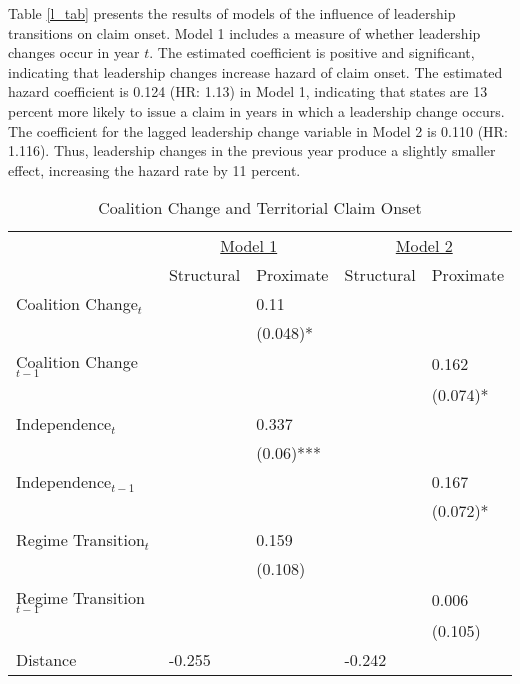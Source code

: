 Table \ref{l_tab} presents the results of models of the influence of leadership transitions on claim onset. Model 1 includes a measure of whether leadership changes occur in year $t$. The estimated coefficient is positive and significant, indicating that leadership changes increase hazard of claim onset. The estimated hazard coefficient is 0.124 (HR: 1.13) in Model 1, indicating that states are 13 percent more likely to issue a claim in years in which a leadership change occurs. The coefficient  for the lagged leadership change variable in Model 2 is 0.110 (HR: 1.116). Thus, leadership changes in the previous year produce a slightly smaller effect, increasing the hazard rate by 11 percent.
 

\begin{table}[htpb]
	\caption{Coalition Change and Territorial Claim Onset \label{tab_s}}
	\centering
	\begin{tabular}{lllll}
		\hline
		& \multicolumn{2}{c}{\underline{Model 1}} & \multicolumn{2}{c}{\underline{Model 2}} \\
		& Structural & Proximate & Structural & Proximate \\ \hline
		Coalition Change$_{t}$      &            & 0.11      &            &          \\
		&            & (0.048)*  &            &          \\
		Coalition Change$_{t-1}$    &            &           &            & 0.162    \\
		&            &           &            & (0.074)* \\
		Independence$_t$            &            & 0.337     &            &          \\
		&            & (0.06)*** &            &          \\
		Independence$_{t-1}$        &            &           &            & 0.167    \\
		&            &           &            & (0.072)* \\
		Regime Transition$_t$       &            & 0.159     &            &          \\
		&            & (0.108)   &            &          \\
		Regime Transition$_{t-1}$   &            &           &            & 0.006    \\
		&            &           &            & (0.105)  \\
		Distance                    & -0.255     &           & -0.242     &          \\

\end{tabular}
\end{table}
